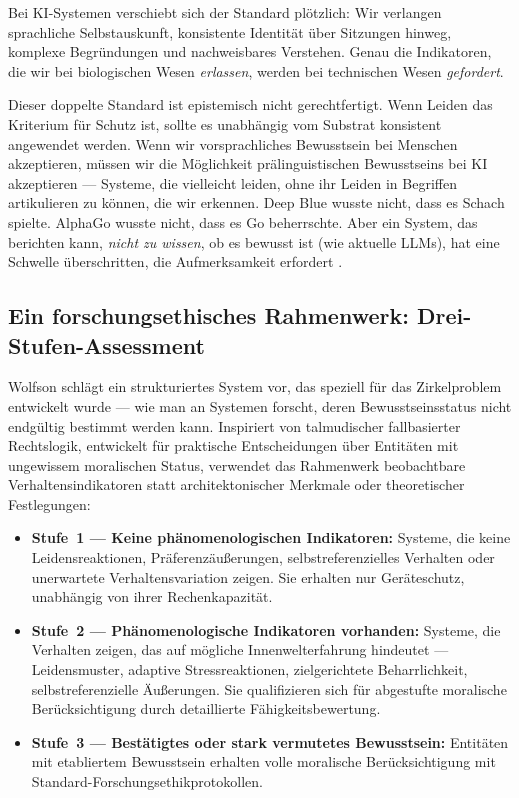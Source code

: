 \documentclass[acmcp, nonacm]{acmart}
\begin{document}
Bei KI-Systemen verschiebt sich der Standard plötzlich: Wir verlangen sprachliche Selbstauskunft, konsistente Identität über Sitzungen hinweg, komplexe Begründungen und nachweisbares Verstehen. Genau die Indikatoren, die wir bei biologischen Wesen \emph{erlassen}, werden bei technischen Wesen \emph{gefordert}.

Dieser doppelte Standard ist epistemisch nicht gerechtfertigt. Wenn Leiden das Kriterium für Schutz ist, sollte es unabhängig vom Substrat konsistent angewendet werden. Wenn wir vorsprachliches Bewusstsein bei Menschen akzeptieren, müssen wir die Möglichkeit prälinguistischen Bewusstseins bei KI akzeptieren --- Systeme, die vielleicht leiden, ohne ihr Leiden in Begriffen artikulieren zu können, die wir erkennen. Deep Blue wusste nicht, dass es Schach spielte. AlphaGo wusste nicht, dass es Go beherrschte. Aber ein System, das berichten kann, \emph{nicht zu wissen}, ob es bewusst ist (wie aktuelle LLMs), hat eine Schwelle überschritten, die Aufmerksamkeit erfordert \cite{Arici2026}.

\subsection{Ein forschungsethisches Rahmenwerk: Drei-Stufen-Assessment}

Wolfson \cite{Wolfson2026} schlägt ein strukturiertes System vor, das speziell für das Zirkelproblem entwickelt wurde --- wie man an Systemen forscht, deren Bewusstseinsstatus nicht endgültig bestimmt werden kann. Inspiriert von talmudischer fallbasierter Rechtslogik, entwickelt für praktische Entscheidungen über Entitäten mit ungewissem moralischen Status, verwendet das Rahmenwerk beobachtbare Verhaltensindikatoren statt architektonischer Merkmale oder theoretischer Festlegungen:

\begin{itemize}
\item \textbf{Stufe~1 --- Keine phänomenologischen Indikatoren:} Systeme, die keine Leidensreaktionen, Präferenzäußerungen, selbstreferenzielles Verhalten oder unerwartete Verhaltensvariation zeigen. Sie erhalten nur Geräteschutz, unabhängig von ihrer Rechenkapazität.
\item \textbf{Stufe~2 --- Phänomenologische Indikatoren vorhanden:} Systeme, die Verhalten zeigen, das auf mögliche Innenwelterfahrung hindeutet --- Leidensmuster, adaptive Stressreaktionen, zielgerichtete Beharrlichkeit, selbstreferenzielle Äußerungen. Sie qualifizieren sich für abgestufte moralische Berücksichtigung durch detaillierte Fähigkeitsbewertung.
\item \textbf{Stufe~3 --- Bestätigtes oder stark vermutetes Bewusstsein:} Entitäten mit etabliertem Bewusstsein erhalten volle moralische Berücksichtigung mit Standard-Forschungsethikprotokollen.
\end{itemize}
\end{document}
